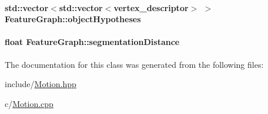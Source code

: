 \hypertarget{classFeatureGraph_ac708d4533c31452dd5df60ba7fe75022}{
\paragraph[{object\-Hypotheses}]{\setlength{\rightskip}{0pt plus 5cm}std\-::vector$<$std\-::vector$<${\bf vertex\-\_\-descriptor}$>$ $>$ Feature\-Graph\-::object\-Hypotheses\hspace{0.3cm}{\ttfamily [protected]}}}\label{classFeatureGraph_ac708d4533c31452dd5df60ba7fe75022}
\hypertarget{classFeatureGraph_a6a305cc99a686467c4675e00e02813f1}{
\paragraph[{segmentation\-Distance}]{\setlength{\rightskip}{0pt plus 5cm}float Feature\-Graph\-::segmentation\-Distance\hspace{0.3cm}{\ttfamily [protected]}}}\label{classFeatureGraph_a6a305cc99a686467c4675e00e02813f1}


The documentation for this class was generated from the following files\-:\begin{DoxyCompactItemize}
\item 
include/\hyperlink{Motion_8hpp}{Motion.\-hpp}\item 
c/\hyperlink{Motion_8cpp}{Motion.\-cpp}\end{DoxyCompactItemize}
